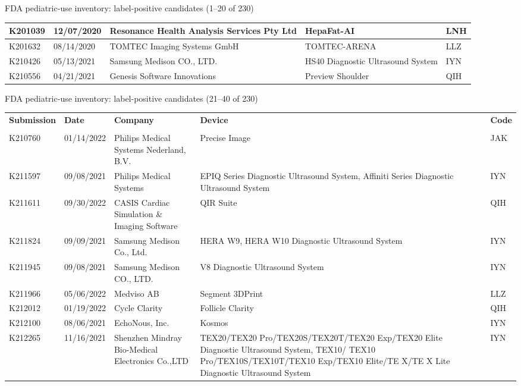 \documentclass[aspectratio=169]{beamer}
\renewcommand{\arraystretch}{1.08}
\begin{document}
\begin{frame}[category=FDA appendix]{FDA pediatric-use inventory: label-positive candidates (1--20 of 230)}
\begin{adjustbox}{max totalsize={\textwidth}{0.78\textheight}}
\begin{tabular}{|p{}|p{}|p{}|p{}|p{}|}
K201039 & 12/07/2020 & Resonance Health Analysis Services Pty Ltd & HepaFat-AI & LNH \\ \hline
K201632 & 08/14/2020 & TOMTEC Imaging Systems GmbH & TOMTEC-ARENA & LLZ \\ \hline
K210426 & 05/13/2021 & Samsung Medison CO., LTD. & HS40 Diagnostic Ultrasound System & IYN \\ \hline
K210556 & 04/21/2021 & Genesis Software Innovations & Preview Shoulder & QIH \\ \hline
\end{tabular}
\end{adjustbox}
\end{frame}
\begin{frame}[category=FDA appendix]{FDA pediatric-use inventory: label-positive candidates (21--40 of 230)}
\begin{adjustbox}{max totalsize={\textwidth}{0.78\textheight}}
\renewcommand{\arraystretch}{1.2}
\begin{tabular}{|p{}|p{}|p{}|p{}|p{}|}
\hline \textbf{Submission} & \textbf{Date} & \textbf{Company} & \textbf{Device} & \textbf{Code} \\\\ \hline
K210760 & 01/14/2022 & Philips Medical Systems Nederland, B.V. & Precise Image & JAK \\ \hline
K211597 & 09/08/2021 & Philips Medical Systems & EPIQ Series Diagnostic Ultrasound System, Affiniti Series Diagnostic Ultrasound System & IYN \\ \hline
K211611 & 09/30/2022 & CASIS Cardiac Simulation \& Imaging Software & QIR Suite & QIH \\ \hline
K211824 & 09/09/2021 & Samsung Medison Co., Ltd. & HERA W9, HERA W10 Diagnostic Ultrasound System & IYN \\ \hline
K211945 & 09/08/2021 & Samsung Medison CO., LTD. & V8 Diagnostic Ultrasound System & IYN \\ \hline
K211966 & 05/06/2022 & Medviso AB & Segment 3DPrint & LLZ \\ \hline
K212012 & 01/19/2022 & Cycle Clarity & Follicle Clarity & QIH \\ \hline
K212100 & 08/06/2021 & EchoNous, Inc. & Kosmos & IYN \\ \hline
K212265 & 11/16/2021 & Shenzhen Mindray Bio-Medical Electronics Co.,LTD & TEX20/TEX20 Pro/TEX20S/TEX20T/TEX20 Exp/TEX20 Elite Diagnostic Ultrasound System, TEX10/ TEX10 Pro/TEX10S/TEX10T/TEX10 Exp/TEX10 Elite/TE X/TE X Lite Diagnostic Ultrasound System & IYN \\ \hline

\end{tabular}
\end{adjustbox}
\end{frame}
\end{document}
